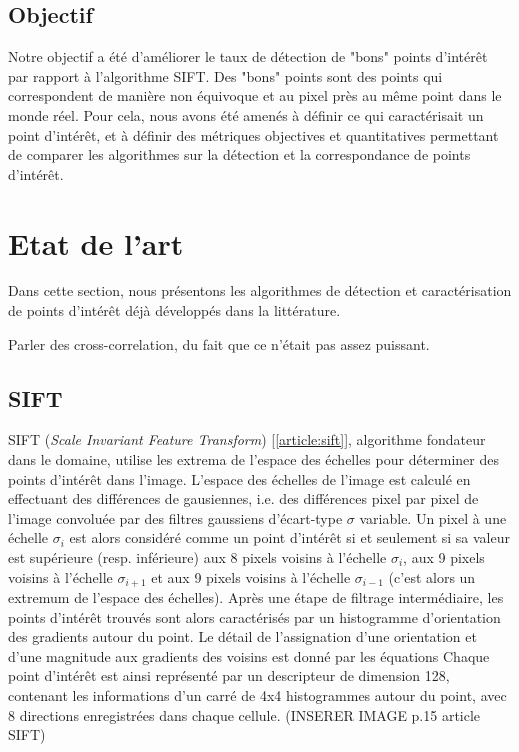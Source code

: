 \documentclass[
	a4paper, %
	10pt, %
	unnumberedsections, %
	twoside, %
]{LTJournalArticle}
\begin{document}
\subsection{Objectif}

Notre objectif a été d'améliorer le taux de détection de "bons" points d'intérêt par rapport à l'algorithme SIFT. Des "bons" points sont des points qui correspondent de manière non équivoque et au pixel près au même point dans le monde réel.
Pour cela, nous avons été amenés à définir ce qui caractérisait un point d'intérêt, et à définir des métriques objectives et quantitatives permettant de comparer les algorithmes sur la détection et la correspondance de points d'intérêt.

\section{Etat de l'art}

Dans cette section, nous présentons les algorithmes de détection et caractérisation de points d'intérêt déjà développés dans la littérature.

Parler des cross-correlation, du fait que ce n'était pas assez puissant.

\subsection{SIFT}

SIFT (\textit{Scale Invariant Feature Transform}) [\ref{article:sift}], algorithme fondateur dans le domaine, utilise les extrema de l'espace des échelles pour déterminer des points d'intérêt dans l'image.
L'espace des échelles de l'image est calculé en effectuant des différences de gausiennes, i.e. des différences pixel par pixel de l'image convoluée par des filtres gaussiens d'écart-type $\sigma$ variable.
Un pixel à une échelle $\sigma_i$ est alors considéré comme un point d'intérêt si et seulement si sa valeur est supérieure (resp. inférieure) aux 8 pixels voisins à l'échelle $\sigma_i$, aux 9 pixels voisins à l'échelle $\sigma_{i+1}$ et aux 9 pixels voisins à l'échelle $\sigma_{i-1}$ (c'est alors un extremum de l'espace des échelles).
Après une étape de filtrage intermédiaire, les points d'intérêt trouvés sont alors caractérisés par un histogramme d'orientation des gradients autour du point.
Le détail de l'assignation d'une orientation et d'une magnitude aux gradients des voisins est donné par les équations %
Chaque point d'intérêt est ainsi représenté par un descripteur de dimension 128, contenant les informations d'un carré de 4x4 histogrammes autour du point, avec 8 directions enregistrées dans chaque cellule. (INSERER IMAGE p.15 article SIFT)
\end{document}
